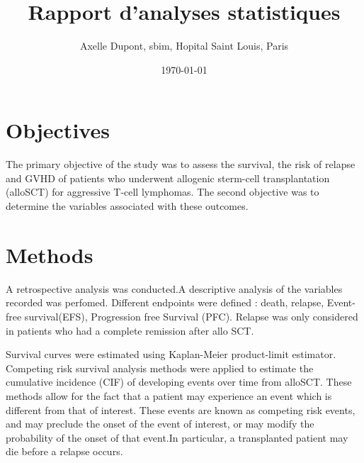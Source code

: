 \documentclass[a4paper,11pt] {article}
\begin{document}
\title{Rapport  d'analyses statistiques}
\author{Axelle Dupont, sbim, Hopital Saint Louis, Paris}
\date\today















\maketitle

\tableofcontents
\pagebreak[4]
\listoftables
\listoffigures


\pagebreak[4]

\section{Objectives}

The primary objective of the study was to assess the survival, the risk of relapse and GVHD  of patients who underwent allogenic sterm-cell transplantation (alloSCT) for aggressive T-cell lymphomas. 
The second objective was to determine the variables associated with these outcomes.

\section{Methods}

A  retrospective analysis was conducted.A descriptive analysis of the variables recorded was perfomed. Different endpoints were defined : death, relapse, Event-free survival(EFS), Progression free Survival (PFC). Relapse was only considered in patients who had a complete remission after allo SCT.

Survival curves were estimated using Kaplan-Meier product-limit estimator.
Competing risk survival analysis methods were applied to estimate the cumulative incidence (CIF) of developing events over time from alloSCT. These methods allow for the fact that a patient may experience an event which is different from that of interest. These events are known as competing risk events, and may preclude the onset of the event of interest, or may modify the probability of the onset of that event.In particular, a transplanted patient may die before a relapse occurs. 
\end{document}
